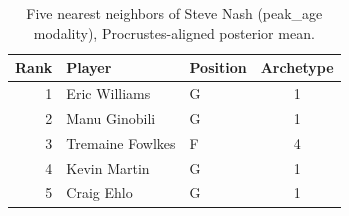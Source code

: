 \begin{table}[htbp]
  \centering\small
  \begin{tabular}{rllc}
    \toprule
    Rank & Player & Position & Archetype \\
    \midrule
    1 & Eric Williams & G & 1 \\
    2 & Manu Ginobili & G & 1 \\
    3 & Tremaine Fowlkes & F & 4 \\
    4 & Kevin Martin & G & 1 \\
    5 & Craig Ehlo & G & 1 \\
    \bottomrule
  \end{tabular}
  \caption{Five nearest neighbors of Steve Nash (peak_age modality), Procrustes-aligned posterior mean.}
  \label{tab:Steve_Nash_neighbors_peak_age}
\end{table}


